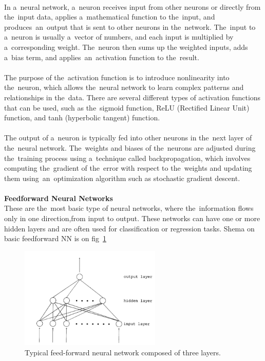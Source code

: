     \\
    In a~neural network, a~neuron receives input from other neurons or directly from the~input data, applies a~mathematical function to the~input, and produces~an~output that is sent to other neurons in the~network. The~input to a~neuron is usually a~vector of numbers, and each input is multiplied by a~corresponding weight. The~neuron then sums up the weighted inputs, adds a~bias term, and applies~an~activation function to the~result.\\
    \\
    The purpose of the~activation function is to introduce nonlinearity into the~neuron, which allows the~neural network to learn complex patterns and relationships in the~data. There are several different types of activation functions that can be used, such as the~sigmoid function, ReLU (Rectified Linear Unit) function, and tanh (hyperbolic tangent) function.\\
    \\
    The output of a~neuron is typically fed into other neurons in the~next layer of the~neural network. The~weights and biases of the~neurons are adjusted during the~training process using a~technique called backpropagation, which involves computing the~gradient of the~error with respect to the~weights and updating them using~an~optimization algorithm such as stochastic gradient descent.\\
    \\
    \textbf{Feedforward Neural Networks}\\
    These are the~most basic type of neural networks, where the~information flows only in one direction,from input to output. These networks can have one or more hidden layers and are often used for classification or regression tasks. Shema on basic feedforward NN is on fig~\ref{fig:ff}
    \begin{center}
        \begin{figure}[!ht]
            \centering
            \includegraphics[width=0.6\textwidth]{figures/ff}
            \caption{Typical feed-forward neural network composed of three layers. \cite{svozil1997quantum}}
            \label{fig:ff}
        \end{figure}
    \end{center}
